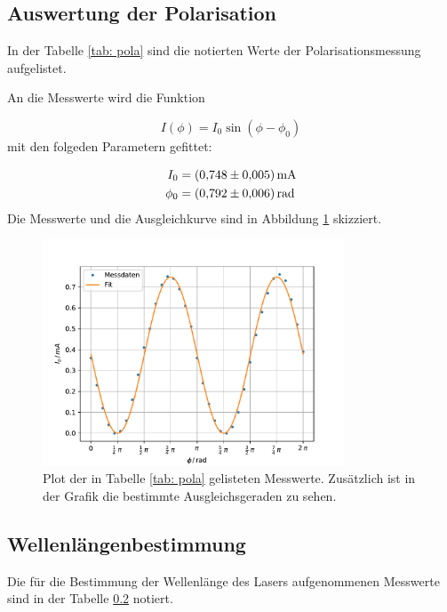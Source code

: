 \subsection{Auswertung der Polarisation}

In der Tabelle \ref{tab: pola} sind die notierten Werte der Polarisationsmessung
aufgelistet.
\FloatBarrier

An die Messwerte wird die Funktion

\begin{equation}
  \label{eq: func_polarisation}
  I(\phi)=I_0\sin\left(\phi-\phi_0\right)
\end{equation}
mit den folgeden Parametern gefittet:

\begin{align}
  \label{eq: fit_pola}
  \begin{aligned}
  I_0&=\SI{0.748\pm0.005}{\milli\ampere}\\
  \phi_0&=\SI{0.792\pm0.006}{\radian}
\end{aligned}
\end{align}
Die Messwerte und die Ausgleichkurve sind in Abbildung \ref{fig: pola} skizziert.

\begin{figure}[h!]
  \centering
  \includegraphics[width=0.8\textwidth]{../Messdaten/plots/pola.pdf}
  \caption{Plot der in Tabelle \ref{tab: pola} gelisteten Messwerte. Zusätzlich ist in der Grafik die bestimmte Ausgleichsgeraden zu sehen.}
  \label{fig: pola}
\end{figure}
\FloatBarrier

\subsection{Wellenlängenbestimmung}
Die für die Bestimmung der Wellenlänge des Lasers aufgenommenen Messwerte sind
in der Tabelle \ref{} notiert.

